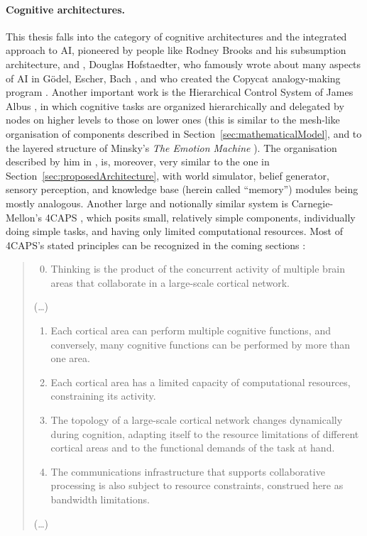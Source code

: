 \paragraph{Cognitive architectures.} This thesis falls into the category of cognitive architectures and the integrated approach to AI, pioneered by people like Rodney Brooks and his subsumption architecture, and \cite{brooksSubsumption}, Douglas Hofstaedter, who famously wrote about many aspects of AI in Gödel, Escher, Bach \cite{geb}, and who created the Copycat analogy-making program \cite{copycat}. Another important work is the Hierarchical Control System of James Albus \cite{albusHCS}, in which cognitive tasks are organized hierarchically and delegated by nodes on higher levels to those on lower ones (this is similar to the mesh-like organisation of components described in Section~\ref{sec:mathematicalModel}, and to the layered structure of Minsky's {\em The Emotion Machine} \cite{emotionMachine}). The organisation described by him in \cite{albus93areference}, is, moreover, very similar to the one in Section~\ref{sec:proposedArchitecture}, with world simulator, belief generator, sensory perception, and knowledge base (herein called ``memory'') modules being mostly analogous. Another large and notionally similar system is Carnegie-Mellon's 4CAPS \cite{4caps}, which posits small, relatively simple components, individually doing simple tasks, and having only limited computational resources. Most of 4CAPS's stated principles can be recognized in the coming sections \cite[Operating Principles of 4CAPS]{4caps}:
\begin{quote}
	\begin{enumerate}
		\setcounter{enumi}{-1}
		\item Thinking is the product of the concurrent activity of multiple brain areas that collaborate in a large-scale cortical network.
	\end{enumerate}
	
	(\dots)
	
	\begin{enumerate}
		\item Each cortical area can perform multiple cognitive functions, and conversely, many cognitive functions can be performed by more than one area.
		\item Each cortical area has a limited capacity of computational resources, constraining its activity.
		\item The topology of a large-scale cortical network changes dynamically during cognition, adapting itself to the resource limitations of different cortical areas and to the functional demands of the task at hand.
		\item The communications infrastructure that supports collaborative processing is also subject to resource constraints, construed here as bandwidth limitations.
	\end{enumerate}
	
	(\dots)
\end{quote}

